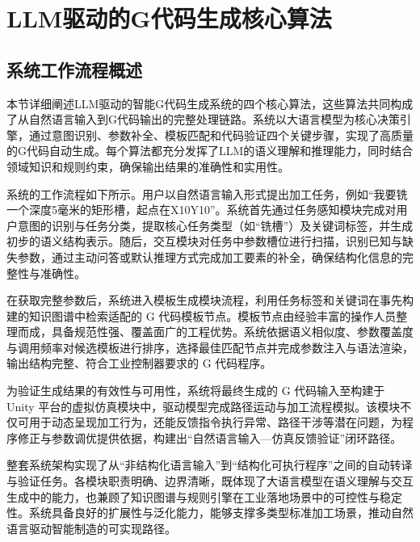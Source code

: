 \documentclass[preprint,12pt]{elsarticle}
\begin{document}

\section{LLM驱动的G代码生成核心算法}

\subsection{系统工作流程概述}

本节详细阐述LLM驱动的智能G代码生成系统的四个核心算法，这些算法共同构成了从自然语言输入到G代码输出的完整处理链路。系统以大语言模型为核心决策引擎，通过意图识别、参数补全、模板匹配和代码验证四个关键步骤，实现了高质量的G代码自动生成。每个算法都充分发挥了LLM的语义理解和推理能力，同时结合领域知识和规则约束，确保输出结果的准确性和实用性。

系统的工作流程如下所示。用户以自然语言输入形式提出加工任务，例如“我要铣一个深度5毫米的矩形槽，起点在X10Y10”。系统首先通过任务感知模块完成对用户意图的识别与任务分类，提取核心任务类型（如“铣槽”）及关键词标签，并生成初步的语义结构表示。随后，交互模块对任务中参数槽位进行扫描，识别已知与缺失参数，通过主动问答或默认推理方式完成加工要素的补全，确保结构化信息的完整性与准确性。

在获取完整参数后，系统进入模板生成模块流程，利用任务标签和关键词在事先构建的知识图谱中检索适配的 G 代码模板节点。模板节点由经验丰富的操作人员整理而成，具备规范性强、覆盖面广的工程优势。系统依据语义相似度、参数覆盖度与调用频率对候选模板进行排序，选择最佳匹配节点并完成参数注入与语法渲染，输出结构完整、符合工业控制器要求的 G 代码程序。

为验证生成结果的有效性与可用性，系统将最终生成的 G 代码输入至构建于 Unity 平台的虚拟仿真模块中，驱动模型完成路径运动与加工流程模拟。该模块不仅可用于动态呈现加工行为，还能反馈指令执行异常、路径干涉等潜在问题，为程序修正与参数调优提供依据，构建出“自然语言输入—仿真反馈验证”闭环路径。

整套系统架构实现了从“非结构化语言输入”到“结构化可执行程序”之间的自动转译与验证任务。各模块职责明确、边界清晰，既体现了大语言模型在语义理解与交互生成中的能力，也兼顾了知识图谱与规则引擎在工业落地场景中的可控性与稳定性。系统具备良好的扩展性与泛化能力，能够支撑多类型标准加工场景，推动自然语言驱动智能制造的可实现路径。
\end{document}

